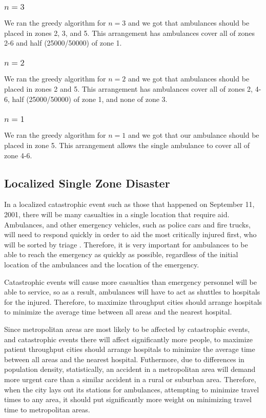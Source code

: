 \documentclass[notitlepage, 12pt]{article}
\begin{document}
\subsubsection{$n=3$}
We ran the greedy algorithm for $n=3$ and we got that ambulances should be placed in zones
2, 3, and 5. This arrangement has ambulances cover all of zones 2-6 and half (25000/50000) of
zone 1.

\subsubsection{$n=2$}
We ran the greedy algorithm for $n=2$ and we got that ambulances should be placed in zones
2 and 5. This arrangement has ambulances cover all of zones 2, 4-6, half (25000/50000) of
zone 1, and none of zone 3.

\subsubsection{$n=1$}
We ran the greedy algorithm for $n=1$ and we got that our ambulance should be placed in zone 5. This arrangement allows the single ambulance to cover all of zone 4-6.

\subsection{Localized Single Zone Disaster}
In a localized catastrophic event such as those that happened on September 11, 2001, there will be
many casualties in a single location that require aid. Ambulances, and other emergency vehicles,
such as police cars and fire trucks, will need to respond quickly in order to aid the most critically
injured first, who will be sorted by triage \cite{ColRev}. Therefore, it is very important for ambulances to be able to
reach the emergency as quickly as possible, regardless of the initial location of the ambulances and the
location of the emergency.

Catastrophic events will cause more casualties than emergency personnel will be able to service, so as a result,
ambulances will have to act as shuttles to hospitals for the injured. Therefore, to maximize throughput
cities should arrange hospitals to minimize the average time between all areas and the nearest
hospital.

Since metropolitan areas are most likely to be affected by catastrophic events, and catastrophic events there
will affect significantly more people, to maximize patient throughput cities should arrange hospitals to minimize
the average time between all areas and the nearest hospital. Futhermore, due to differences in population density,
statistically, an accident in a metropolitan area will demand more urgent care than a similar accident
in a rural or suburban area. Therefore, when the city lays out its stations for ambulances, attempting to minimize
travel times to any area, it should put significantly more weight on minimizing travel time to metropolitan areas.
\end{document}

